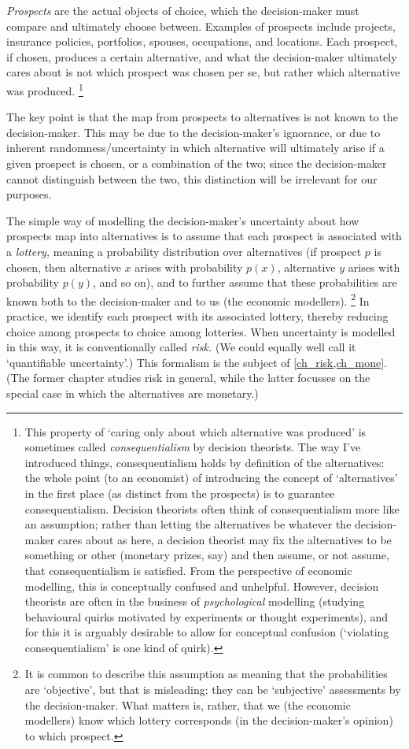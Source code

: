 \documentclass[11pt,letterpaper,reqno,oneside]{book}
\begin{document}
\emph{Prospects} are the actual objects of choice, which the decision-maker must compare and ultimately choose between. Examples of prospects include projects, insurance policies, portfolios, spouses, occupations, and locations. Each prospect, if chosen, produces a certain alternative, and what the decision-maker ultimately cares about is not which prospect was chosen per se, but rather which alternative was produced.%
	\footnote{\label{footnote:consequentialism}This property of `caring only about which alternative was produced' is sometimes called \emph{consequentialism} by decision theorists. The way I've introduced things, consequentialism holds by definition of the alternatives: the whole point (to an economist) of introducing the concept of `alternatives' in the first place (as distinct from the prospects) is to guarantee consequentialism. Decision theorists often think of consequentialism more like an assumption; rather than letting the alternatives be whatever the decision-maker cares about as here, a decision theorist may fix the alternatives to be something or other (monetary prizes, say) and then assume, or not assume, that consequentialism is satisfied. From the perspective of economic modelling, this is conceptually confused and unhelpful. However, decision theorists are often in the business of \emph{psychological} modelling (studying behavioural quirks motivated by experiments or thought experiments), and for this it is arguably desirable to allow for conceptual confusion (`violating consequentialism' is one kind of quirk).}

The key point is that the map from prospects to alternatives is not known to the decision-maker. This may be due to the decision-maker's ignorance, or due to inherent randomness/uncertainty in which alternative will ultimately arise if a given prospect is chosen, or a combination of the two; since the decision-maker cannot distinguish between the two, this distinction will be irrelevant for our purposes.

The simple way of modelling the decision-maker's uncertainty about how prospects map into alternatives is to assume that each prospect is associated with a \emph{lottery,} meaning a probability distribution over alternatives (if prospect $p$ is chosen, then alternative $x$ arises with probability $p(x)$, alternative $y$ arises with probability $p(y)$, and so on), and to further assume that these probabilities are known both to the decision-maker and to us (the economic modellers).%
	\footnote{It is common to describe this assumption as meaning that the probabilities are `objective', but that is misleading: they can be `subjective' assessments by the decision-maker. What matters is, rather, that we (the economic modellers) know which lottery corresponds (in the decision-maker's opinion) to which prospect.}
In practice, we identify each prospect with its associated lottery, thereby reducing choice among prospects to choice among lotteries. When uncertainty is modelled in this way, it is conventionally called \emph{risk.} (We could equally well call it `quantifiable uncertainty'.) This formalism is the subject of \cref{ch_risk,ch_mone}. (The former chapter studies risk in general, while the latter focusses on the special case in which the alternatives are monetary.)
\end{document}
